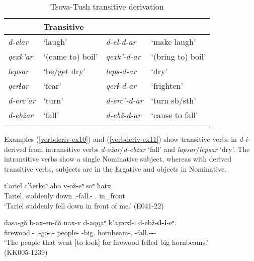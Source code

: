 \vfill
\begin{table}[H]
	\begin{tabular}{llll}
		\lsptoprule
		\multicolumn{2}{l}{Intransitive} & \multicolumn{2}{l}{Transitive} \\
		\midrule
		\textit{d-elar} & `laugh' &	\textit{d-el-d-ar} &  `make laugh' \\
		\textit{qexk'ar} & `(come to) boil' & \textit{qexk'-d-ar} & `(bring to) boil' \\
		\textit{lepsar} & `be/get dry' & \textit{leps-d-ar} & `dry' \\
		\textit{qerɬar} & `fear' & \textit{qerɬ-d-ar} & `frighten' \\
		\textit{d-erc'ar} & `turn' & \textit{d-erc'-d-ar} & `turn sb/sth' \\
		\textit{d-ebžar} & `fall' & \textit{d-ebž-d-ar} & `cause to fall' \\
		\lspbottomrule
	\end{tabular}
	\caption{Tsova-Tush transitive derivation}
	\label{verbderiv-table3}
\end{table}
\vfill
\pagebreak

Examples (\ref{verbderiv-ex10}) and (\ref{verbderiv-ex11}) show transitive verbs in \textit{d-i-} derived from intransitive verbs \textit{d-ožar}/\textit{d-ebžar} `fall' and \textit{lapsar}/\textit{lepsar} `dry'. The intransitive verbs show a single Nominative subject, whereas with derived transitive verbs, subjects are in the Ergative and objects in Nominative.

\begin{exe}
	\ex\label{verbderiv-ex10}
	\begin{xlist}
		
		
			\ex\label{verbderiv-ex10a}
			\gll t'ariel c'ʕerkoⁿ aħo v-ož-eⁿ soⁿ ħatx. \\
			Tariel.{\Nom} suddenly down {\M}.{\Sg}-fall.{\Pfv}-{\Aor} {\Fsg}.{\Dat} in\_front \\
			\trans `Tariel suddenly fell down in front of me.'
			\hfill (E041-22)
		
		
		
			\ex\label{verbderiv-ex10b}
			\gll dasa-g\u{o} b-ax-en-č\u{o} nax-v d-aqqaⁿ k'ajrcxl-i d-ebž-\textbf{d-i}-eⁿ. \\
			firewood.{\Obl}-{\All} {\M}.{\Pl}-go-{\Ptcp}.{\Pst}-{\Obl} people-{\Erg} {\D}-big.{\Pl} hornbeam-{\Pl}.{\Nom} {\D}-fall.{\Ipfv}-\textbf{{\D}-{\Tr}}-{\Aor} \\
			\trans `The people that went [to look] for firewood felled big hornbeams.' \\
			\hfill (KK005-1239)
		
		
	\end{xlist}
\end{exe}

